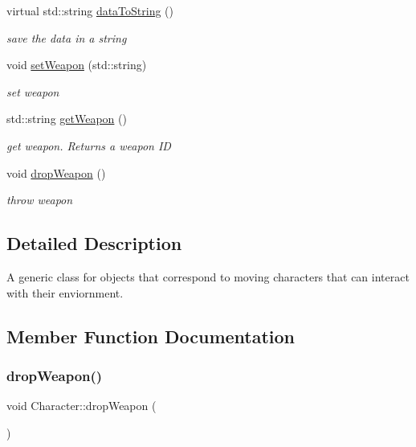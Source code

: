 \begin{DoxyCompactItemize}
\mbox{\label{class_character_ad0d14b85124c5d0da611b2b925968277}} 
virtual std\+::string \mbox{\hyperlink{class_character_ad0d14b85124c5d0da611b2b925968277}{data\+To\+String}} ()
\begin{DoxyCompactList}\small\item\em save the data in a string \end{DoxyCompactList}\item 
void \mbox{\hyperlink{class_character_a2f2e942630667cc24ec25e36bde9b1aa}{set\+Weapon}} (std\+::string)
\begin{DoxyCompactList}\small\item\em set weapon \end{DoxyCompactList}\item 
std\+::string \mbox{\hyperlink{class_character_aaaa94fe3ab4da7641c7e50ca3a9896d4}{get\+Weapon}} ()
\begin{DoxyCompactList}\small\item\em get weapon. Returns a weapon ID \end{DoxyCompactList}\item 
void \mbox{\hyperlink{class_character_ad7b5e823203c92964c4ff6b3d699ef85}{drop\+Weapon}} ()
\begin{DoxyCompactList}\small\item\em throw weapon \end{DoxyCompactList}\end{DoxyCompactItemize}


\subsection{Detailed Description}
A generic class for objects that correspond to moving characters that can interact with their enviornment. 

\subsection{Member Function Documentation}
\mbox{\label{class_character_ad7b5e823203c92964c4ff6b3d699ef85}} 
\subsubsection{\texorpdfstring{drop\+Weapon()}{dropWeapon()}}
{\footnotesize\ttfamily void Character\+::drop\+Weapon (\begin{DoxyParamCaption}{ }\end{DoxyParamCaption})}



